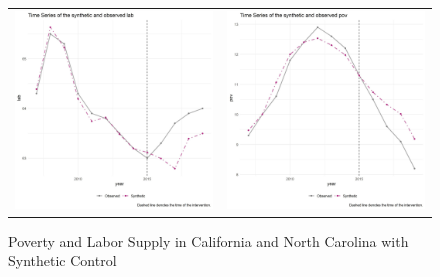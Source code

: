 \documentclass{article}
\begin{document}
\begin{figure}
\begin{center}
\caption{Poverty and Labor Supply in California and North Carolina with Synthetic Control}
\label{fig:series}{}
\begin{tabular}{cc}
 \includegraphics[width=80mm]{ca_lab_trend} &   \includegraphics[width=80mm]{ca_pov_trend} \\

\end{tabular}
\end{center}
\end{figure}
\end{document}
